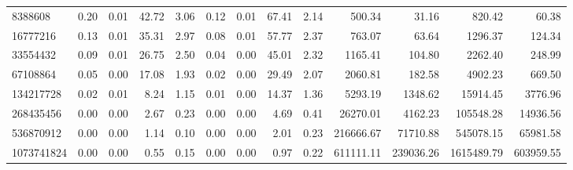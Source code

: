\begin{tabular}{lrrrrrrrrrrrr}
8388608 & 0.20 & 0.01 & 42.72 & 3.06 & 0.12 & 0.01 & 67.41 & 2.14 & 500.34 & 31.16 & 820.42 & 60.38 \\
16777216 & 0.13 & 0.01 & 35.31 & 2.97 & 0.08 & 0.01 & 57.77 & 2.37 & 763.07 & 63.64 & 1296.37 & 124.34 \\
33554432 & 0.09 & 0.01 & 26.75 & 2.50 & 0.04 & 0.00 & 45.01 & 2.32 & 1165.41 & 104.80 & 2262.40 & 248.99 \\
67108864 & 0.05 & 0.00 & 17.08 & 1.93 & 0.02 & 0.00 & 29.49 & 2.07 & 2060.81 & 182.58 & 4902.23 & 669.50 \\
134217728 & 0.02 & 0.01 & 8.24 & 1.15 & 0.01 & 0.00 & 14.37 & 1.36 & 5293.19 & 1348.62 & 15914.45 & 3776.96 \\
268435456 & 0.00 & 0.00 & 2.67 & 0.23 & 0.00 & 0.00 & 4.69 & 0.41 & 26270.01 & 4162.23 & 105548.28 & 14936.56 \\
536870912 & 0.00 & 0.00 & 1.14 & 0.10 & 0.00 & 0.00 & 2.01 & 0.23 & 216666.67 & 71710.88 & 545078.15 & 65981.58 \\
1073741824 & 0.00 & 0.00 & 0.55 & 0.15 & 0.00 & 0.00 & 0.97 & 0.22 & 611111.11 & 239036.26 & 1615489.79 & 603959.55 \\
\bottomrule
\end{tabular}

